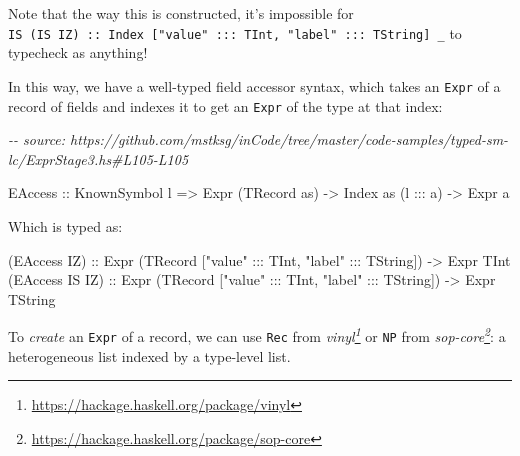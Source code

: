 \documentclass[]{article}
\newenvironment{Shaded}{}{}
\newcommand{\CommentTok}[1]{\textcolor[rgb]{0.38,0.63,0.69}{\textit{#1}}}
\newcommand{\DataTypeTok}[1]{\textcolor[rgb]{0.56,0.13,0.00}{#1}}
\newcommand{\NormalTok}[1]{#1}
\newcommand{\OperatorTok}[1]{\textcolor[rgb]{0.40,0.40,0.40}{#1}}
\newcommand{\OtherTok}[1]{\textcolor[rgb]{0.00,0.44,0.13}{#1}}
\newcommand{\StringTok}[1]{\textcolor[rgb]{0.25,0.44,0.63}{#1}}
\renewcommand{\href}[2]{#2\footnote{\url{#1}}}
\begin{document}
Note that the way this is constructed, it's impossible for
\texttt{IS\ (IS\ IZ)\ ::\ Index\ {[}"value"\ :::\ TInt,\ "label"\ :::\ TString{]}\ \_}
to typecheck as anything!

In this way, we have a well-typed field accessor syntax, which takes an
\texttt{Expr} of a record of fields and indexes it to get an \texttt{Expr} of
the type at that index:

\begin{Shaded}
\begin{Highlighting}[]
\CommentTok{{-}{-} source: https://github.com/mstksg/inCode/tree/master/code{-}samples/typed{-}sm{-}lc/ExprStage3.hs\#L105{-}L105}

  \DataTypeTok{EAccess}\OtherTok{ ::} \DataTypeTok{KnownSymbol}\NormalTok{ l }\OtherTok{=\textgreater{}} \DataTypeTok{Expr}\NormalTok{ (}\DataTypeTok{TRecord}\NormalTok{ as) }\OtherTok{{-}\textgreater{}} \DataTypeTok{Index}\NormalTok{ as (l }\OperatorTok{:::}\NormalTok{ a) }\OtherTok{{-}\textgreater{}} \DataTypeTok{Expr}\NormalTok{ a}
\end{Highlighting}
\end{Shaded}

Which is typed as:

\begin{Shaded}
\begin{Highlighting}[]
\NormalTok{(}\OtherTok{\textasciigrave{}EAccess\textasciigrave{}} \DataTypeTok{IZ}\NormalTok{)}\OtherTok{    ::} \DataTypeTok{Expr}\NormalTok{ (}\DataTypeTok{TRecord}\NormalTok{ [}\StringTok{"value"} \OperatorTok{:::} \DataTypeTok{TInt}\NormalTok{, }\StringTok{"label"} \OperatorTok{:::} \DataTypeTok{TString}\NormalTok{]) }\OtherTok{{-}\textgreater{}} \DataTypeTok{Expr} \DataTypeTok{TInt}
\NormalTok{(}\OtherTok{\textasciigrave{}EAccess\textasciigrave{}} \DataTypeTok{IS} \DataTypeTok{IZ}\NormalTok{)}\OtherTok{ ::} \DataTypeTok{Expr}\NormalTok{ (}\DataTypeTok{TRecord}\NormalTok{ [}\StringTok{"value"} \OperatorTok{:::} \DataTypeTok{TInt}\NormalTok{, }\StringTok{"label"} \OperatorTok{:::} \DataTypeTok{TString}\NormalTok{]) }\OtherTok{{-}\textgreater{}} \DataTypeTok{Expr} \DataTypeTok{TString}
\end{Highlighting}
\end{Shaded}

To \emph{create} an \texttt{Expr} of a record, we can use \texttt{Rec} from
\emph{\href{https://hackage.haskell.org/package/vinyl}{vinyl}} or \texttt{NP}
from \emph{\href{https://hackage.haskell.org/package/sop-core}{sop-core}}: a
heterogeneous list indexed by a type-level list.
\end{document}
